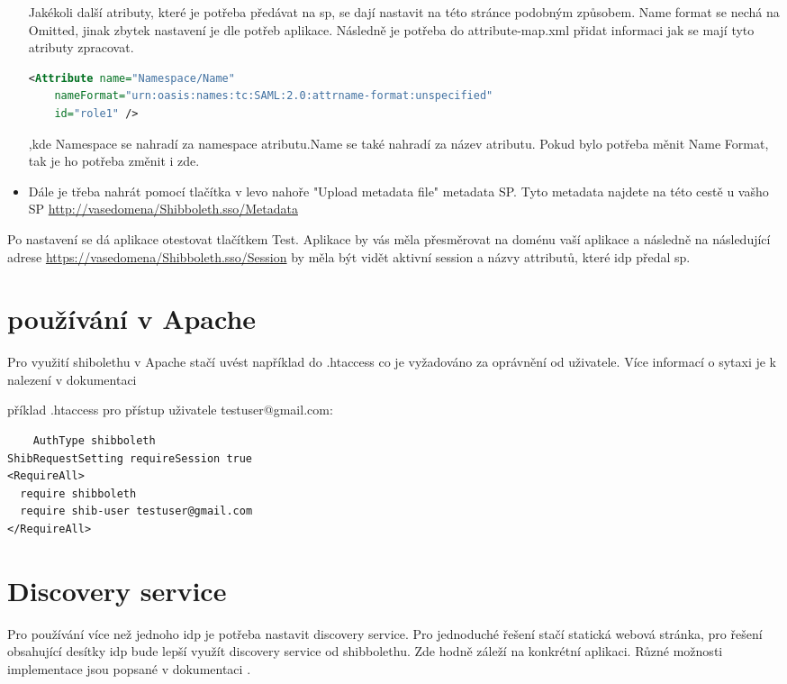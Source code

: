 \begin{itemize}
Jakékoli další atributy, které je potřeba předávat na sp, se dají nastavit na této stránce podobným způsobem. Name format se nechá na Omitted, jinak zbytek nastavení je dle potřeb aplikace. Následně je potřeba do attribute-map.xml přidat informaci jak se mají tyto atributy zpracovat.
   \begin{lstlisting}[language=XML]
     <Attribute name="Namespace/Name"
    nameFormat="urn:oasis:names:tc:SAML:2.0:attrname-format:unspecified"
    id="role1" />
    \end{lstlisting}
,kde Namespace se nahradí za namespace atributu.Name se také nahradí za název atributu. Pokud bylo potřeba měnit Name Format, tak je ho potřeba změnit i zde.
    


    \item Dále je třeba nahrát pomocí tlačítka v levo nahoře "Upload metadata file" metadata SP. Tyto metadata najdete na této cestě u vašho SP \url{http://vasedomena/Shibboleth.sso/Metadata}

\end{itemize}

Po nastavení se dá aplikace otestovat tlačítkem Test. Aplikace by vás měla přesměrovat na doménu vaší aplikace a následně na následující adrese \url{https://vasedomena/Shibboleth.sso/Session} by měla být vidět aktivní session a názvy attributů, které idp předal sp.

\section{používání v Apache}

Pro využití shibolethu v Apache stačí uvést například do .htaccess co je vyžadováno za oprávnění od uživatele. Více informací o sytaxi je k nalezení v dokumentaci\cite{SPApache}\cite{SPhtaccess} \linebreak

příklad .htaccess pro přístup uživatele testuser@gmail.com:

 \begin{lstlisting}
    AuthType shibboleth
ShibRequestSetting requireSession true
<RequireAll>
  require shibboleth
  require shib-user testuser@gmail.com
</RequireAll>
    \end{lstlisting}


\section{Discovery service}
Pro používání více než jednoho idp je potřeba nastavit discovery service. Pro jednoduché řešení stačí statická webová stránka, pro řešení obsahující desítky idp bude lepší využít discovery service od shibbolethu. Zde hodně záleží na konkrétní aplikaci. Různé možnosti implementace jsou popsané v dokumentaci \cite{IdPDiscovery}. 
